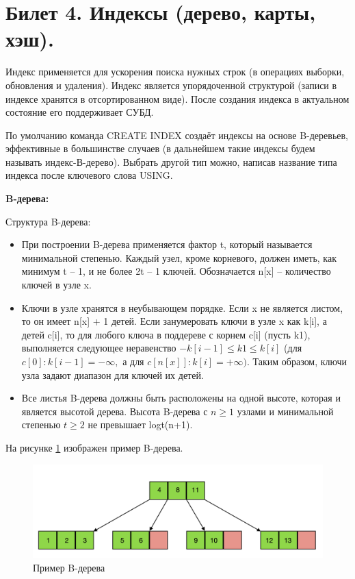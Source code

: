 \newpage
\section {Билет 4. Индексы (дерево, карты, хэш).}

Индекс применяется для ускорения поиска нужных строк (в операциях
выборки, обновления и удаления). Индекс является упорядоченной структурой (записи в индексе хранятся в отсортированном виде). После создания индекса в актуальном состояние его поддерживает СУБД.

По умолчанию команда CREATE INDEX создаёт индексы на основе B-деревьев, эффективные в большинстве случаев (в дальнейшем такие индексы будем называть индекс-В-дерево). Выбрать другой тип можно, написав название типа индекса после ключевого слова USING.

\textbf{B-дерева:} 

Структура B-дерева: 
\begin{itemize}
    \item При построении B-дерева применяется фактор t, который называется минимальной степенью. Каждый узел, кроме корневого, должен иметь, как минимум t – 1, и не более 2t – 1 ключей. Обозначается n[x] – количество ключей в узле x.
    \item Ключи в узле хранятся в неубывающем порядке. Если x не является листом, то он имеет n[x] + 1 детей. Если занумеровать ключи в узле x как k[i], а детей c[i], то для любого ключа в поддереве с корнем c[i] (пусть k1), выполняется следующее неравенство $-k[i-1] \leq k1 \leq k[i]$ (для $c[0]: k[i-1] = -\infty,$ а для $c[n[x]]: k[i] = +\infty)$. Таким образом, ключи узла задают диапазон для ключей их детей.
    \item Все листья B-дерева должны быть расположены на одной высоте, которая и является высотой дерева. Высота B-дерева с $n \geq 1$ узлами и минимальной степенью $t\geq 2$ не превышает logt(n+1).
\end{itemize}

На рисунке \ref{fig:tree} изображен пример B-дерева. 

\begin{figure}[!h]
    \centering
    \includegraphics[scale = 0.1]{4/B-tree.png}
    \caption{Пример B-дерева}
    \label{fig:tree}
\end{figure}


